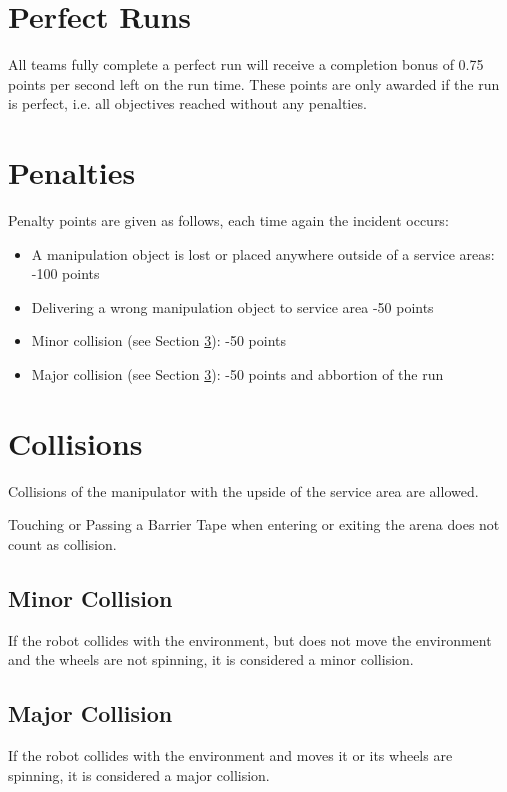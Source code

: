 \section{Perfect Runs}
All teams fully complete a perfect run will receive a completion bonus of 0.75 points per second left on the run time. These points are only awarded if the run is perfect, i.e. all objectives reached without any penalties.

\section{Penalties}
Penalty points are given as follows, each time again the incident occurs:

\begin{itemize}
	\item A manipulation object is lost or placed anywhere outside of a service areas: \hfill -100 points
	\item Delivering a wrong manipulation object to service area \hfill -50 points
	\item Minor collision (see Section \ref{sec:Collisions}): \hfill -50 points
	\item Major collision (see Section \ref{sec:Collisions}): \hfill -50 points and abbortion of the run
\end{itemize}

\section{Collisions}\label{sec:Collisions}
Collisions of the manipulator with the upside of the service area are allowed.

Touching or Passing a Barrier Tape when entering or exiting the arena does not count as collision.

\subsection{Minor Collision}
If the robot collides with the environment, but does not move the environment and the wheels are not spinning, it is considered a minor collision. 

\subsection{Major Collision}
If the robot collides with the environment and moves it or its wheels are spinning, it is considered a major collision.

